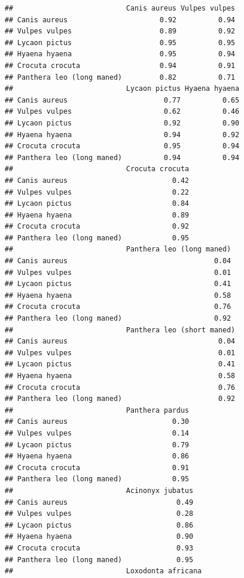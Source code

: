 \documentclass[
]{article}
\begin{document}
\begin{verbatim}
##                           Canis aureus Vulpes vulpes
## Canis aureus                      0.92          0.94
## Vulpes vulpes                     0.89          0.92
## Lycaon pictus                     0.95          0.95
## Hyaena hyaena                     0.95          0.94
## Crocuta crocuta                   0.94          0.91
## Panthera leo (long maned)         0.82          0.71
##                           Lycaon pictus Hyaena hyaena
## Canis aureus                       0.77          0.65
## Vulpes vulpes                      0.62          0.46
## Lycaon pictus                      0.92          0.90
## Hyaena hyaena                      0.94          0.92
## Crocuta crocuta                    0.95          0.94
## Panthera leo (long maned)          0.94          0.94
##                           Crocuta crocuta
## Canis aureus                         0.42
## Vulpes vulpes                        0.22
## Lycaon pictus                        0.84
## Hyaena hyaena                        0.89
## Crocuta crocuta                      0.92
## Panthera leo (long maned)            0.95
##                           Panthera leo (long maned)
## Canis aureus                                   0.04
## Vulpes vulpes                                  0.01
## Lycaon pictus                                  0.41
## Hyaena hyaena                                  0.58
## Crocuta crocuta                                0.76
## Panthera leo (long maned)                      0.92
##                           Panthera leo (short maned)
## Canis aureus                                    0.04
## Vulpes vulpes                                   0.01
## Lycaon pictus                                   0.41
## Hyaena hyaena                                   0.58
## Crocuta crocuta                                 0.76
## Panthera leo (long maned)                       0.92
##                           Panthera pardus
## Canis aureus                         0.30
## Vulpes vulpes                        0.14
## Lycaon pictus                        0.79
## Hyaena hyaena                        0.86
## Crocuta crocuta                      0.91
## Panthera leo (long maned)            0.95
##                           Acinonyx jubatus
## Canis aureus                          0.49
## Vulpes vulpes                         0.28
## Lycaon pictus                         0.86
## Hyaena hyaena                         0.90
## Crocuta crocuta                       0.93
## Panthera leo (long maned)             0.95
##                           Loxodonta africana

\end{verbatim}
\end{document}
